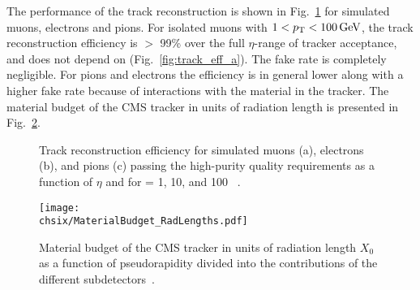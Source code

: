 The performance of the track reconstruction is shown in Fig.~\ref{fig:track_eff} for simulated muons, electrons and pions.
For isolated muons with $1 < p_{\mathrm{T}} < 100\,\text{Ge\hspace{-.08em}V}$, the track reconstruction efficiency is $>$ 99\% over the full $\eta$-range of tracker acceptance, and does not depend on \pt (Fig.~\ref{fig:track_eff_a}). The fake rate is completely negligible. For pions and electrons the efficiency is in general lower along with a higher fake rate because of interactions with the material in the tracker. The material budget of the CMS tracker in units of radiation length is presented in Fig.~\ref{fig:budgetCMStracker}.

\begin{figure}[!htb]
\centering
{}
\caption{Track reconstruction efficiency for simulated muons (a), electrons (b), and pions (c) passing the high-purity quality requirements as a function of $\eta$ and for \pt = 1, 10, and 100 \GeV~\cite{Chatrchyan:2014fea}.}
\label{fig:track_eff}
\end{figure}

\begin{figure}[!htb]
 \begin{center}
  \texttt{[image: \\chsix/MaterialBudget\_RadLengths.pdf]}
 \end{center}
 \caption{Material budget of the CMS tracker in units of radiation length $X_0$ as a function of pseudorapidity divided into the contributions of the different subdetectors~\cite{Chatrchyan:2014fea}.}
 \label{fig:budgetCMStracker}
\end{figure}

